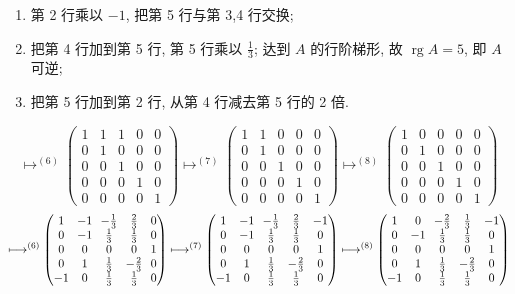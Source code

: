 \begin{enumerate}
\item[(3)] 第 2 行乘以 $-1$, 把第 5 行与第 3,4 行交换;
\item[(4)] 把第 4 行加到第 5 行, 第 5 行乘以 $\frac{1}{3}$; 达到 $A$ 的行阶梯形, 故
$\operatorname{rg} A = 5$, 即 $A$ 可逆;
\item[(5)] 把第 5 行加到第 2 行, 从第 4 行减去第 5 行的 2 倍.
\end{enumerate}
\[
\longmapsto^{(6)} \begin{pmatrix} 1 & 1 & 1 & 0 & 0 \\ 0 & 1 & 0 & 0 & 0 \\ 0 & 0 & 1 & 0 & 0 \\ 0 & 0 & 0 & 1 & 0 \\ 0 & 0 & 0 & 0 & 1 \end{pmatrix}
\longmapsto^{(7)} \begin{pmatrix} 1 & 1 & 0 & 0 & 0 \\ 0 & 1 & 0 & 0 & 0 \\ 0 & 0 & 1 & 0 & 0 \\ 0 & 0 & 0 & 1 & 0 \\ 0 & 0 & 0 & 0 & 1 \end{pmatrix}
\longmapsto^{(8)} \begin{pmatrix} 1 & 0 & 0 & 0 & 0 \\ 0 & 1 & 0 & 0 & 0 \\ 0 & 0 & 1 & 0 & 0 \\ 0 & 0 & 0 & 1 & 0 \\ 0 & 0 & 0 & 0 & 1 \end{pmatrix}
\]
\[
{\setlength{\arraycolsep}{3.5pt}
\longmapsto^{(6)} \begin{pmatrix} 1 & -1 & -\frac{1}{3} & \frac{2}{3} & 0 \\ 0 & -1 & \frac{1}{3} & \frac{1}{3} & 0 \\ 0 & 0 & 0 & 0 & 1 \\ 0 & 1 & \frac{1}{3} & -\frac{2}{3} & 0 \\ -1 & 0 & \frac{1}{3} & \frac{1}{3} & 0 \end{pmatrix}
\longmapsto^{(7)} \begin{pmatrix} 1 & -1 & -\frac{1}{3} & \frac{2}{3} & -1 \\ 0 & -1 & \frac{1}{3} & \frac{1}{3} & 0 \\ 0 & 0 & 0 & 0 & 1 \\ 0 & 1 & \frac{1}{3} & -\frac{2}{3} & 0 \\ -1 & 0 & \frac{1}{3} & \frac{1}{3} & 0 \end{pmatrix}
\longmapsto^{(8)} \begin{pmatrix} 1 & 0 & -\frac{2}{3} & \frac{1}{3} & -1 \\ 0 & -1 & \frac{1}{3} & \frac{1}{3} & 0 \\ 0 & 0 & 0 & 0 & 1 \\ 0 & 1 & \frac{1}{3} & -\frac{2}{3} & 0 \\ -1 & 0 & \frac{1}{3} & \frac{1}{3} & 0 \end{pmatrix}
}
\]
